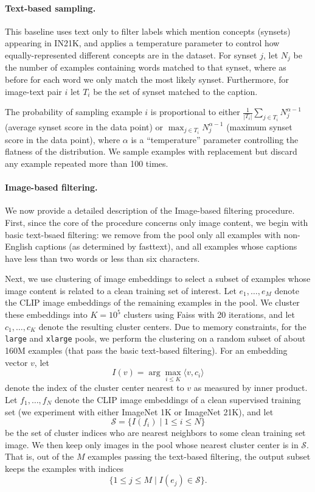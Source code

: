 \paragraph{Text-based sampling.} 
This baseline uses text only to filter labels which mention concepts (synsets) appearing in IN21K, and applies a temperature parameter to control how equally-represented different concepts are in the dataset.
For synset $j$, let $N_j$ be the number of examples containing words matched to that synset, where as before for each word we only match the most likely synset. Furthermore, for image-text pair $i$ let $T_i$ be the set of synset matched to the caption. 

The probability of sampling example $i$ is proportional to either 
$
\frac{1}{|T_i|} \sum_{j \in T_{i}} N_{j}^{\alpha-1}
$ (average synset score in the data point)
or 
$
\max_{j \in T_{i}} N_{j}^{\alpha-1}
$ (maximum synset score in the data point), where $\alpha$ is a ``temperature'' parameter controlling the flatness of the distribution. We sample examples with replacement but discard any example repeated more than 100 times.

\paragraph{Image-based filtering.}
We now provide a detailed description of the Image-based filtering procedure. First, since the core of the procedure concerns only image content, we begin with basic text-bsaed filtering: we remove from the pool only all examples with non-English captions (as determined by fasttext), and all examples whose captions have less than two words or less than six characters. 

Next, we use clustering of image embeddings to select a subset of examples whose image content is related to a clean training set of interest.
Let $e_1, \ldots, e_M$ denote the CLIP image embeddings of the remaining examples in the pool. We cluster these embeddings into $K=10^5$ clusters using Faiss with 20 iterations, and let $c_1, \ldots, c_K$ denote the resulting cluster centers. Due to memory constraints, for the \texttt{large}  and \texttt{xlarge} pools,
we perform the clustering on a random subset of about 160M examples (that pass the basic text-based filtering). For an embedding vector $v$, let
\[
I(v) = \arg\max_{i\le K} 
{\langle v , c_i \rangle}
\]
 denote the index of the cluster center nearest to $v$ as measured by inner product.
 Let $f_1, \ldots, f_N$ denote the CLIP image embeddings of a clean supervised training set (we experiment with either ImageNet 1K or ImageNet 21K), and let
\[
\mathcal{S} = \{I(f_i) \mid 1 \le i \le N\}
\]
be the set of cluster indices who are nearest neighbors to some clean training set image. We then keep only images in the pool whose nearest cluster center is in $\mathcal{S}$. That is, out of the $M$ examples passing the text-based filtering, the output subset keeps the examples with indices
\[
\{1\le j\le M\mid I(e_j)\in\mathcal{S}\}.
\]


